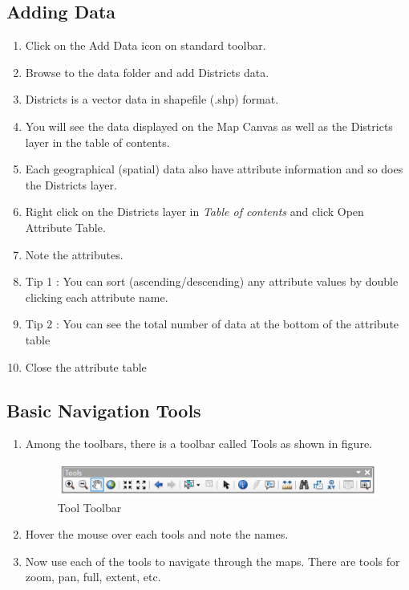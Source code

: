 \subsection{Adding Data}
\begin{enumerate}
\item{Click on the Add Data icon on standard toolbar.}
\item{Browse to the data folder and add Districts data.}
\item{Districts is a vector data in shapefile (.shp) format.}
\item{You will see the data displayed on the Map Canvas as well as the Districts layer in the table of contents.}
\item{Each geographical (spatial) data also have attribute information and so does the Districts layer.}
\item{Right click on the Districts layer in \emph{Table of contents} and click Open Attribute Table.}
\item{Note the attributes.}
\item{Tip 1 : You can sort (ascending/descending) any attribute values by double clicking each attribute name.}
\item{Tip 2 : You can see the total number of data at the bottom of the attribute table}
\item{Close the attribute table}
\end{enumerate}

\subsection{Basic Navigation Tools}
\begin{enumerate}
\item{Among the toolbars, there is a toolbar called Tools as shown in figure.}
\begin{figure}[h]
	\label{fig:Tool_Toolbar}
	\centering
	\includegraphics[scale=0.5]{images/tool_toolbar}
	\caption{Tool Toolbar}
	\end{figure}
\item{Hover the mouse over each tools and note the names.}
\item{Now use each of the tools to navigate through the maps. There are tools for zoom, pan, full, extent, etc.}
\end{enumerate}

